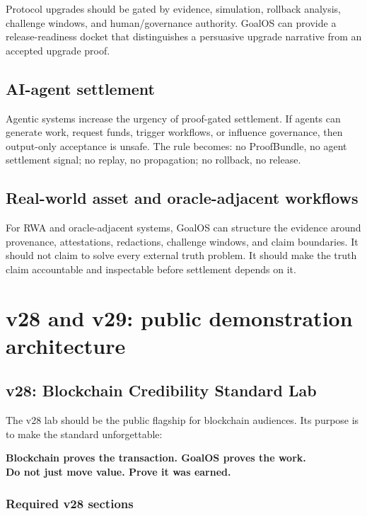 \documentclass[11pt]{article}
\begin{document}
Protocol upgrades should be gated by evidence, simulation, rollback analysis, challenge windows, and human/governance authority. GoalOS can provide a release-readiness docket that distinguishes a persuasive upgrade narrative from an accepted upgrade proof.

\subsection{AI-agent settlement}

Agentic systems increase the urgency of proof-gated settlement. If agents can generate work, request funds, trigger workflows, or influence governance, then output-only acceptance is unsafe. The rule becomes: no ProofBundle, no agent settlement signal; no replay, no propagation; no rollback, no release.

\subsection{Real-world asset and oracle-adjacent workflows}

For RWA and oracle-adjacent systems, GoalOS can structure the evidence around provenance, attestations, redactions, challenge windows, and claim boundaries. It should not claim to solve every external truth problem. It should make the truth claim accountable and inspectable before settlement depends on it.

\section{v28 and v29: public demonstration architecture}

\subsection{v28: Blockchain Credibility Standard Lab}

The v28 lab should be the public flagship for blockchain audiences. Its purpose is to make the standard unforgettable:

\begin{center}
{\Large\bfseries Blockchain proves the transaction. GoalOS proves the work.}\\[2pt]
{\large\bfseries Do not just move value. Prove it was earned.}
\end{center}

\subsubsection*{Required v28 sections}
\end{document}
